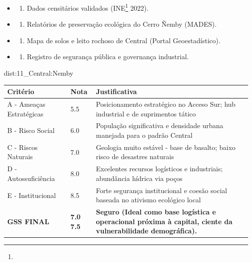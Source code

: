 {\begin{itemize}
\tightlist
\item
  \begin{enumerate}
  \def\labelenumi{\arabic{enumi})}
  \tightlist
  \item
    Dados censitários validados (INE\footnote{\fineINE} 2022).
  \end{enumerate}
\item
  \begin{enumerate}
  \def\labelenumi{\arabic{enumi})}
  \setcounter{enumi}{1}
  \tightlist
  \item
    Relatórios de preservação ecológica do Cerro Ñemby (MADES).
  \end{enumerate}
\item
  \begin{enumerate}
  \def\labelenumi{\arabic{enumi})}
  \setcounter{enumi}{2}
  \tightlist
  \item
    Mapa de solos e leito rochoso de Central (Portal Geoestadístico).
  \end{enumerate}
\item
  \begin{enumerate}
  \def\labelenumi{\arabic{enumi})}
  \setcounter{enumi}{3}
  \tightlist
  \item
    Registro de segurança pública e governança industrial.
  \end{enumerate}
\end{itemize}}{dist:11_Central:Nemby}
\begin{table}[ht!]
\small \begin{tabular}{p{3.0cm}p{0.8cm}p{6.0cm}} \toprule
\textbf{Critério} & \textbf{Nota} & \textbf{Justificativa} \\ \midrule
A - Ameaças Estratégicas & 5.5 & Posicionamento estratégico no Acceso Sur; hub industrial e de suprimentos tático \\
B - Risco Social & 6.0 & População significativa e densidade urbana manejada para o padrão Central \\
C - Riscos Naturais & 7.0 & Geologia muito estável - base de basalto; baixo risco de desastres naturais \\
D - Autossuficiência & 8.0 & Excelentes recursos logísticos e industriais; abundância hídrica via poços \\
E - Institucional & 8.5 & Forte segurança institucional e coesão social baseada no ativismo ecológico local \\
\midrule \textbf{GSS FINAL} & \textbf{7.0
7.5} & \textbf{Seguro (Ideal como base logística e operacional próxima à capital, ciente da vulnerabilidade demográfica).} \\ \bottomrule \end{tabular}
\end{table}
